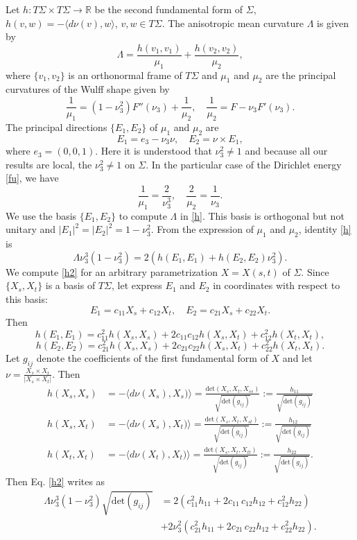 \documentclass[12pt,a4paper,reqno]{amsart}
\def\r{\mathbb R}
\begin{document}
Let $h\colon T\Sigma\times T\Sigma\to\r$ be the second fundamental form of $\Sigma$, $h(v,w)=-\langle d\nu(v),w\rangle$, $v,w\in T\Sigma$. 
The anisotropic mean curvature $\Lambda$ is given by 
\begin{equation}\label{h}
\Lambda=\frac{h(v_1,v_1)}{\mu_1}+\frac{h(v_2,v_2)}{\mu_2},
\end{equation}
where     $\{v_1,v_2\}$ is    an orthonormal frame of $T\Sigma$ and $\mu_1$ and $\mu_2$ are the principal curvatures of the Wulff shape   given by 
$$\frac{1}{\mu_1}=(1-\nu_3^2)F''(\nu_3)+\frac{1}{\mu_2},\quad \frac{1}{\mu_2}=F-\nu_3F'(\nu_3).$$
The principal directions $\{E_1,E_2\}$ of $\mu_1$ and $\mu_2$ are
$$E_1=e_3-\nu_3\nu,\quad E_2=\nu\times E_1,$$
where $e_3=(0,0,1)$. Here it is understood that $\nu_3^2\not=1$ and  because all our results are local, the $\nu_3^2\not=1$ on $\Sigma$.   In the particular case of the Dirichlet energy \eqref{fu}, we have 
$$\frac{1}{\mu_1}=\frac{2}{\nu_3^3},\quad \frac{2}{\mu_2}=\frac{1}{\nu_3}.$$
We use the basis  $\{E_1,E_2\}$ to compute $\Lambda$ in \eqref{h}. This basis is orthogonal but not unitary and $|E_1|^2=|E_2|^2=1-\nu_3^2$. From the expression of $\mu_1$ and $\mu_2$, identity   \eqref{h} is  
\begin{equation}\label{h2}
\Lambda\nu_3^3(1-\nu_3^2)=2\left(h(E_1,E_1)+ h(E_2,E_2)\nu_3^2\right) . 
\end{equation}
 We compute   \eqref{h2} for an arbitrary parametrization $X=X(s,t)$ of $\Sigma$. Since  $\{X_s,X_t\}$ is a basis of $T\Sigma$,   let express $E_1$ and $E_2$ in coordinates with respect to this basis:
\begin{equation}\label{e1e2}
E_1=c_{11} X_s+c_{12}X_t,\quad 
E_2=c_{21}X_s+c_{22}X_t.
\end{equation}
Then
$$h(E_1,E_1)=c_{11}^2h(X_s,X_s)+2 c_{11}c_{12}h(X_s,X_t)+c_{12}^2h(X_t,X_t),$$
$$h(E_2,E_2)=c_{21}^2h(X_s,X_s)+2 c_{21}c_{22}h(X_s,X_t)+c_{22}^2h(X_t,X_t).$$
Let $g_{ij}$ denote the coefficients of the first fundamental form of $X$ and let $\nu=\frac{X_s\times X_t}{|X_s\times X_t|}$. Then 
\begin{equation*}
\begin{split}
h(X_s,X_s)&=-\langle d\nu(X_s),X_s)\rangle=\frac{\mbox{det}(X_s,X_t,X_{ss})}{\sqrt{\mbox{det}(g_{ij})}}:=\frac{h_{11}}{\sqrt{\mbox{det}(g_{ij})}}\\
h(X_s,X_t)&=-\langle d\nu(X_s),X_t)\rangle=\frac{\mbox{det}(X_s,X_t,X_{st})}{\sqrt{\mbox{det}(g_{ij})}}:=\frac{h_{12}}{\sqrt{\mbox{det}(g_{ij})}}\\
h(X_t,X_t)&=-\langle d\nu(X_t),X_t)\rangle=\frac{\mbox{det}(X_s,X_t,X_{tt})}{\sqrt{\mbox{det}(g_{ij})}}:=\frac{h_{22}}{\sqrt{\mbox{det}(g_{ij})}}.
\end{split}
\end{equation*}
Then Eq. \eqref{h2} writes as
\begin{equation}\label{h3}
\begin{split}
\Lambda\nu_3^3(1-\nu_3^2) \sqrt{\mbox{det}(g_{ij})}&=
2 (c_{11}^2h_{11}+2c_{11}\,c_{12}h_{12} +c_{12}^2h_{22})\\
&+2\nu_3^2 ( c_{21}^2h_{11}+2c_{21}\,c_{22}h_{12} +c_{22}^2h_{22}).
\end{split}
\end{equation}
\end{document}
